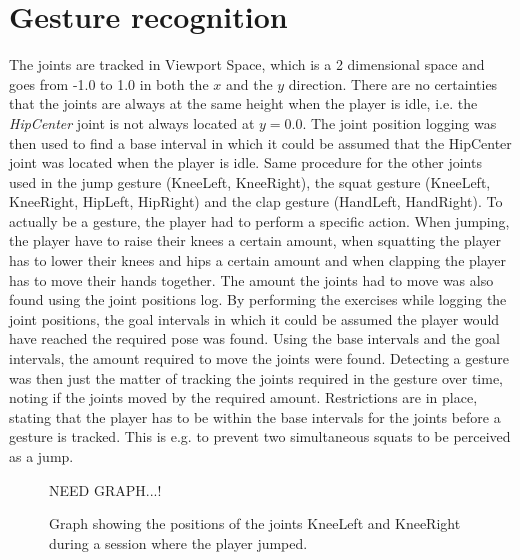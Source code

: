 \documentclass[11pt]{report}
\begin{document}
\section{Gesture recognition}
The joints are tracked in Viewport Space, which is a 2 dimensional space and goes from -1.0 to 1.0 in both the $x$ and the $y$ direction. There are no certainties that the joints are always at the same height when the player is idle, i.e. the \emph{HipCenter} joint is not always located at $y = 0.0$. The joint position logging was then used to find a base interval in which it could be assumed that the HipCenter joint was located when the player is idle. Same procedure for the other joints used in the jump gesture (KneeLeft, KneeRight), the squat gesture (KneeLeft, KneeRight, HipLeft, HipRight) and the clap gesture (HandLeft, HandRight). To actually be a gesture, the player had to perform a specific action. When jumping, the player have to raise their knees a certain amount, when squatting the player has to lower their knees and hips a certain amount and when clapping the player has to move their hands together. The amount the joints had to move was also found using the joint positions log. By performing the exercises while logging the joint positions, the goal intervals in which it could be assumed the player would have reached the required pose was found. Using the base intervals and the goal intervals, the amount required to move the joints were found. Detecting a gesture was then just the matter of tracking the joints required in the gesture over time, noting if the joints moved by the required amount. Restrictions are in place, stating that the player has to be within the base intervals for the joints before a gesture is tracked. This is e.g. to prevent two simultaneous squats to be perceived as a jump.

\begin{figure}[H]
NEED GRAPH...!
\caption[Graph depicting joint tracking of KneeLeft and KneeRight]{Graph showing the positions of the joints KneeLeft and KneeRight during a session where the player jumped.}
\end{figure}
\end{document}

